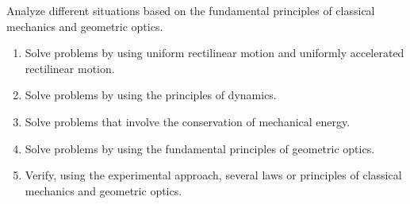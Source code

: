 {Analyze different situations based on the fundamental principles of classical mechanics and geometric optics.
\smallskip

\begin{enumerate}
\item Solve problems by using uniform rectilinear motion and uniformly accelerated rectilinear motion.
\item Solve problems by using the principles of dynamics.
\item Solve problems that involve the conservation of mechanical energy.
\item Solve problems by using the fundamental principles of geometric optics.
\item Verify, using the experimental approach, several laws or principles of classical mechanics and geometric optics.
\end{enumerate}
}
